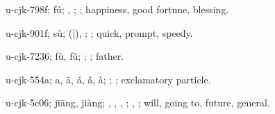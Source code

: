 \begin{multicols}{2}
{\cjkgGlue{}u-cjk-798f; fú; \cjkgGlue{}, \cjkgGlue{}; \cjkgGlue{}; happiness, good fortune, blessing.

\cjkgGlue{}u-cjk-901f; sù; \cjkgGlue{}\cjkgGlue{}(\cjkgGlue{}|\cjkgGlue{}), \cjkgGlue{}\cjkgGlue{}\cjkgGlue{}; \cjkgGlue{}; quick, prompt, speedy.

\cjkgGlue{}u-cjk-7236; fù, fǔ; \cjkgGlue{}; \cjkgGlue{}; father.

\cjkgGlue{}u-cjk-554a; a, ā, á, ǎ, à; \cjkgGlue{}; \cjkgGlue{}; exclamatory particle.

\cjkgGlue{}u-cjk-5c06; jiāng, jiàng; \cjkgGlue{}\cjkgGlue{}\cjkgGlue{}, \cjkgGlue{}, \cjkgGlue{}\cjkgGlue{}\cjkgGlue{}, \cjkgGlue{}; \cjkgGlue{}, \cjkgGlue{}; will, going to, future, general.

}
\end{multicols}
